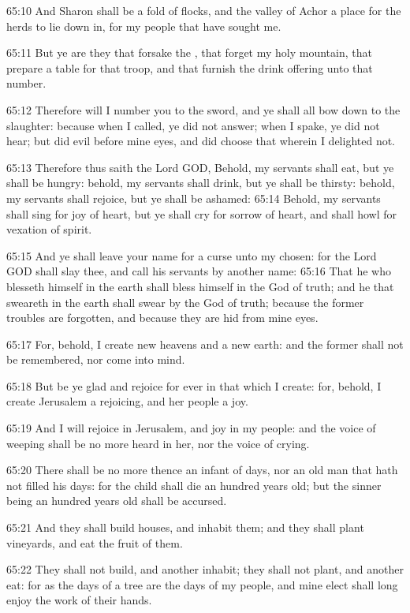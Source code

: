 65:10 And Sharon shall be a fold of flocks, and the valley of Achor a place for the herds to lie down in, for my people that have sought me.

65:11 But ye are they that forsake the \LORD, that forget my holy mountain, that prepare a table for that troop, and that furnish the drink offering unto that number.

65:12 Therefore will I number you to the sword, and ye shall all bow down to the slaughter: because when I called, ye did not answer; when I spake, ye did not hear; but did evil before mine eyes, and did choose that wherein I delighted not.

65:13 Therefore thus saith the Lord GOD, Behold, my servants shall eat, but ye shall be hungry: behold, my servants shall drink, but ye shall be thirsty: behold, my servants shall rejoice, but ye shall be ashamed: 65:14 Behold, my servants shall sing for joy of heart, but ye shall cry for sorrow of heart, and shall howl for vexation of spirit.

65:15 And ye shall leave your name for a curse unto my chosen: for the Lord GOD shall slay thee, and call his servants by another name: 65:16 That he who blesseth himself in the earth shall bless himself in the God of truth; and he that sweareth in the earth shall swear by the God of truth; because the former troubles are forgotten, and because they are hid from mine eyes.

65:17 For, behold, I create new heavens and a new earth: and the former shall not be remembered, nor come into mind.

65:18 But be ye glad and rejoice for ever in that which I create: for, behold, I create Jerusalem a rejoicing, and her people a joy.

65:19 And I will rejoice in Jerusalem, and joy in my people: and the voice of weeping shall be no more heard in her, nor the voice of crying.

65:20 There shall be no more thence an infant of days, nor an old man that hath not filled his days: for the child shall die an hundred years old; but the sinner being an hundred years old shall be accursed.

65:21 And they shall build houses, and inhabit them; and they shall plant vineyards, and eat the fruit of them.

65:22 They shall not build, and another inhabit; they shall not plant, and another eat: for as the days of a tree are the days of my people, and mine elect shall long enjoy the work of their hands.

